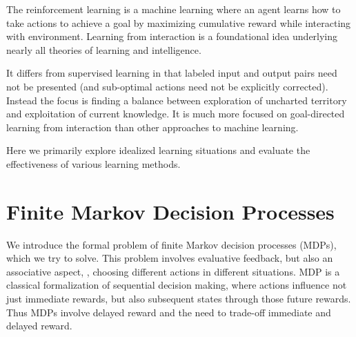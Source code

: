 

\newcommand{\pol}{\ensuremath{\pi}}
\newcommand{\optpol}{\ensuremath{{\pol}_\ast}}
\newcommand{\polset}{\ensuremath{\Pi}}
\newcommand{\curs}{s}
\newcommand{\cura}{a}
\newcommand{\nexta}{{a'}}
\newcommand{\nexts}{{s'}}
\newcommand{\condsetbig}[2]{\left\{\left.#1\right|#2\right\}}
\newcommand{\condprobbig}[2]{p\left(\left.#1\right|#2\right)}
\newcommand{\Condprobbig}[2]{P\left(\left.#1\right|#2\right)}
\newcommand{\df}{\gamma}
\newcommand{\condprobb}[2]{p(#1|#2)}
\newcommand{\suppk}[1]{\ensuremath{\mathcal{#1}}}
\newcommand{\suppx}{\suppk{X}}
\newcommand{\suppy}{\suppk{Y}}
\newcommand{\suppz}{\suppk{Z}}
\renewcommand{\Expect}{\mathbf{E}}

\newcommand{\stateset}{\ensuremath{\mathcal{S}}}
\newcommand{\actionset}{\ensuremath{\mathcal{A}}}

\newcommand{\assign}{\leftarrow}


The reinforcement learning is a machine learning where an agent learns how to take actions to achieve a goal
by maximizing cumulative reward while interacting with environment.
Learning from interaction is a foundational idea underlying nearly all theories of learning and intelligence.

It differs from supervised learning in that labeled input and output pairs need not be presented
(and sub-optimal actions need not be explicitly corrected).
Instead the focus is finding a balance between exploration of uncharted territory and exploitation of current knowledge.
It is much more focused on goal-directed learning from interaction than other approaches to machine learning.

Here we primarily explore idealized learning situations and evaluate the effectiveness of various learning methods.


\section{Finite Markov Decision Processes}

We introduce the formal problem of finite Markov decision processes (MDPs),
which we try to solve.
This problem involves evaluative feedback,
but also an associative aspect, \ie, choosing different actions in different situations.
MDP is a classical formalization of sequential decision making,
where actions influence not just immediate rewards,
but also subsequent states through those future rewards.
Thus MDPs involve delayed reward and the need to trade-off immediate and delayed reward.

